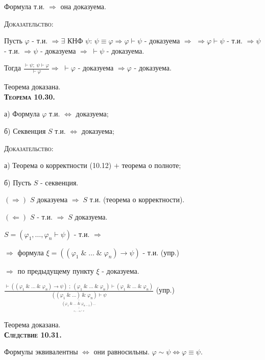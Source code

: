 \documentclass[18pt, a4paper]{extarticle}
\newcommand{\ampersand}{\;\&\;}
\newcommand{\vp}{\varphi}
\newcommand{\vd}{\vdash}
\begin{document}
Формула т.и. $\Rightarrow$ она доказуема.

\textsc{Доказательство:}

Пусть $\vp$ - т.и. $\Rightarrow\exists$ КНФ $\psi$: $\psi\equiv\vp\Rightarrow\vp\vd\psi$ - доказуема $\Rightarrow$ \newline$\Rightarrow\vp\vd\psi$ - т.и. $\Rightarrow\psi$ - т.и. $\Rightarrow\psi$ - доказуема $\Rightarrow\;\vd\!\psi$ - доказуема. 

Тогда $\displaystyle \frac{\vd\psi;\;\psi\vd\vp}{\vd\vp}\Rightarrow\;\vd\!\vp$ - доказуема $\Rightarrow\vp$ - доказуема.

Теорема доказана.\\

\textbf{\textsc{Теорема 10.30.}}

а) Формула $\varphi$ т.и. $\Leftrightarrow$ доказуема;

б) Секвенция $S$ т.и. $\Leftrightarrow$ доказуема;

\textsc{Доказательство:}

а) Теорема о корректности (10.12) $+$ теорема о полноте;

б) Пусть $S$ -  секвенция.

$\boxed{(\Rightarrow)}$ $S$ доказуема $\Rightarrow\;S$ т.и. (теорема о корректности).

$\boxed{(\Leftarrow)}$ $S$ -  т.и. $\Rightarrow\;S$ доказуема. 

$S=(\varphi_1,\dots,\varphi_n\vdash\psi)$ -  т.и. $\Rightarrow$ 

$\Rightarrow$ формула $\xi=((\varphi_1\ampersand\dots\ampersand\varphi_n)\to\psi)$ -  т.и. (упр.)

$\Rightarrow$ по предыдущему пункту $\xi$ -  доказуема.

\begin{center}
\scalebox{0.86}
{
$\displaystyle \frac{\vdash((\varphi_1\ampersand\dots\ampersand\varphi_n)\to\psi)\;;\;(\varphi_1\ampersand\dots\ampersand\varphi_n)\vdash(\varphi_1\ampersand\dots\ampersand\varphi_n)}{\underset{\displaystyle \underset{\displaystyle \underset{\displaystyle \overline{\varphi_1,\dots,\varphi_n\vdash\psi}}{\dots}}{\underline{(\varphi_1\ampersand\dots\ampersand\varphi_{n-1})\dots}}}{\underline{((\varphi_1\ampersand\dots)\ampersand\varphi_n)\vdash\psi}}}$ (упр.)
}
\end{center}
Теорема доказана.\\

\textbf{\textsc{Следствие 10.31.}} 

Формулы эквивалентны $\Leftrightarrow$ они равносильны. $\varphi\sim\psi\Leftrightarrow\varphi\equiv\psi$.
\end{document}
